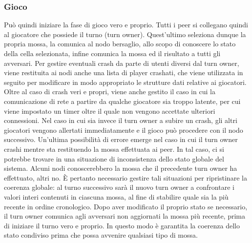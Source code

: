 \subsubsection{Gioco}
Può quindi iniziare la fase di gioco vero e proprio. Tutti i peer si 
collegano quindi al giocatore che possiede il turno (turn owner). %
Quest'ultimo seleziona dunque la propria mossa, la comunica al nodo bersaglio, 
allo scopo di conoscere lo stato della cella selezionata, infine comunica la 
mossa ed il risultato a tutti gli avversari. Per gestire eventuali crash 
da parte di utenti diversi dal turn owner, viene restituita ai nodi anche una 
lista di player crashati, che viene utilizzata in seguito per modificare in 
modo appropriato le strutture dati relative ai giocatori. Oltre al caso di crash 
veri e propri, viene anche gestito il caso in cui la comunicazione di rete a 
partire da qualche giocatore sia troppo latente, per cui viene impostato un 
timer oltre il quale non vengono accettate ulteriori connessioni.
Nel caso in cui sia invece il turn owner a subire un crash, gli altri giocatori 
vengono allertati immediatamente e il gioco può procedere con il nodo 
successivo.
Un'ultima possibilità di errore emerge nel caso in cui il turn owner crashi 
mentre sta restituendo la mossa effettuata ai peer. In tal caso, ci 
si potrebbe trovare in una situazione di inconsistenza dello stato globale del 
sistema. Alcuni nodi conoscerebbero la mossa che il precedente turn owner ha 
effettuato, altri no. È pertanto necessario gestire tali situazioni per 
ripristinare la coerenza globale: al turno successivo sarà il nuovo turn owner 
a confrontare i valori interi contenuti in ciascuna mossa, al fine di 
stabilire quale sia la più recente in ordine cronologico.
Dopo aver modificato il proprio stato se necessario, il turn owner comunica agli 
avversari non aggiornati la mossa più 
recente, prima di iniziare il turno vero e proprio. In questo modo è garantita 
la coerenza dello stato condiviso prima che possa avvenire qualsiasi tipo di 
mossa.
